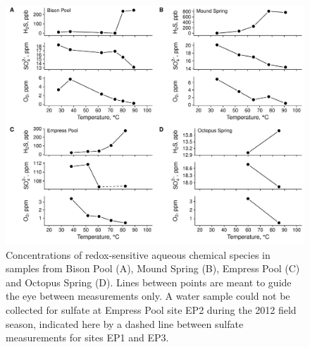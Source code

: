 \begin{landscape}
\begin{table}
\begin{adjustbox}{width=600pt,keepaspectratio}
\begin{threeparttable}
\begin{tablenotes}


\end{tablenotes}

  \label{tab:IPL_ZC}
  \end{threeparttable}
  \end{adjustbox}
\end{table}

\end{landscape}
\doublespace




\singlespace
\begin{figure}[h]
\centering
\includegraphics[width=1\linewidth]{figs_ch1/scatterplot_-_hot_spring_redox.pdf}
\caption[Concentrations of redox-sensitive aqueous chemical species in samples from Bison Pool, Mound Spring, Empress Pool, and Octopus Spring]{Concentrations of redox-sensitive aqueous chemical species in samples from Bison Pool (A), Mound Spring (B), Empress Pool (C) and Octopus Spring (D). Lines between points are meant to guide the eye between measurements only. A water sample could not be collected for sulfate at Empress Pool site EP2 during the 2012 field season, indicated here by a dashed line between sulfate measurements for sites EP1 and EP3.}
\label{fig:redox}
\end{figure}
\doublespace

